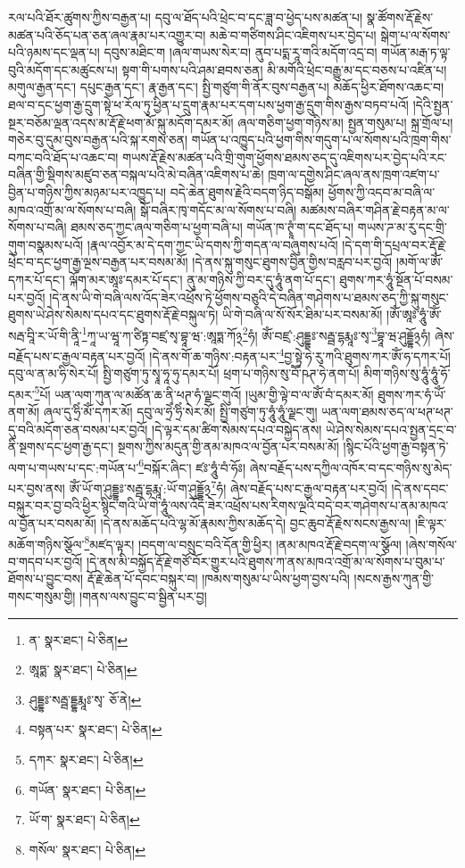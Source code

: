 རལ་པའི་ཐོར་ཚུགས་ཀྱིས་བརྒྱན་པ། དབུ་ལ་ཐོད་པའི་ཕྲེང་བ་དང་ཟླ་བ་ཕྱེད་པས་མཚན་པ། སྣ་ཚོགས་རྡོ་རྗེས་མཚན་པའི་ཅོད་པན་ཅན་ཞལ་རྣམ་པར་འགྱུར་བ། མཆེ་བ་གཙིགས་ཤིང་འཇིགས་པར་བྱེད་པ། སྒེག་པ་ལ་སོགས་པའི་ཉམས་དང་ལྡན་པ། དབུས་མཐིང་ག །ཞལ་གཡས་སེར་བ། ནུབ་པདྨ་རཱ་གའི་མདོག་འདྲ་བ། གཡོན་མརྒ་ཏ་ལྟ་བུའི་མདོག་དང་མཚུངས་པ། སྟག་གི་པགས་པའི་ཤམ་ཐབས་ཅན། མི་མགོའི་ཕྲེང་བརྒྱུ་མ་དང་བཅས་པ་འཛིན་པ། མགུལ་རྒྱན་དང་། དཔུང་རྒྱན་དང་། རྣ་རྒྱན་དང་། སྤྱི་གཙུག་གི་ནོར་བུས་བརྒྱན་པ། མཆོད་ཕྱིར་ཐོགས་འཆང་བ། ཐལ་བ་དང་ཕྱག་རྒྱ་དྲུག་སྟེ་ཕ་རོལ་ཏུ་ཕྱིན་པ་དྲུག་རྣམ་པར་དག་པས་ཕྱག་རྒྱ་དྲུག་གིས་རྒྱས་བཏབ་པའོ། །དེའི་སྤྱན་སྔར་བཅོམ་ལྡན་འདས་མ་རྡོ་རྗེ་ཕག་མོ་སྐུ་མདོག་དམར་མོ། ཞལ་གཅིག་ཕྱག་གཉིས་མ། སྤྱན་གསུམ་པ། སྐྲ་གྲོལ་པ། གཅེར་བུ་དུམ་བུས་བརྒྱན་པའི་སྐ་རགས་ཅན། གཡོན་པ་འཁྱུད་པའི་ཕྱག་གིས་གདུག་པ་ལ་སོགས་པའི་ཁྲག་གིས་བཀང་བའི་ཐོད་པ་འཆང་བ། གཡས་རྡོ་རྗེས་མཚན་པའི་གྲི་གུག་ཕྱོགས་ཐམས་ཅད་དུ་འཇིགས་པར་བྱེད་པའི་རང་བཞིན་གྱི་སྡིགས་མཛུབ་ཅན་བསྐལ་པའི་མེ་བཞིན་འཇིགས་པ་ཆེ། ཁྲག་ལ་དགྱེས་ཤིང་ཞལ་ནས་ཁྲག་འཛག་པ་བྱིན་པ་གཉིས་ཀྱིས་མཉམ་པར་འཁྱུད་པ། བདེ་ཆེན་ཐུགས་རྗེའི་བདག་ཉིད་བསྒོམ། ཕྱོགས་ཀྱི་འདབ་མ་བཞི་ལ་མཁའ་འགྲོ་མ་ལ་སོགས་པ་བཞི། སྒོ་བཞིར་ཁྭ་གདོང་མ་ལ་སོགས་པ་བཞི། མཚམས་བཞིར་གཤིན་རྗེ་བརྟན་མ་ལ་སོགས་པ་བཞི། ཐམས་ཅད་ཀྱང་ཞལ་གཅིག་པ་ཕྱག་བཞི་པ། གཡོན་ཁ་ཊྭཱཾ་ག་དང་ཐོད་པ། གཡས་ཌ་མ་རུ་དང་གྲི་གུག་བསྣམས་པའོ། །རྣལ་འབྱོར་མ་དེ་དག་ཀྱང་ཡི་དགས་ཀྱི་གདན་ལ་བཞུགས་པའོ། །དེ་དག་གི་དཔྲལ་བར་རྡོ་རྗེ་ཕྲེང་བ་དང་ཕྱག་རྒྱ་ལྔས་བརྒྱན་པར་བསམ་མོ། །དེ་ནས་སྐུ་གསུང་ཐུགས་བྱིན་གྱིས་བརླབ་པར་བྱའོ། །མགོ་ལ་ཨོཾ་དཀར་པོ་དང་། ལྐོག་མར་ཨཱཿ་དམར་པོ་དང་། ནུ་མ་གཉིས་ཀྱི་བར་དུ་ཧཱུཾ་ནག་པོ་དང་། ཐུགས་ཀར་ཧཱུཾ་སྔོན་པོ་བསམ་པར་བྱའོ། །དེ་ནས་ཡི་གེ་བཞི་ལས་འོད་ཟེར་འཕྲོས་ཏེ་ཕྱོགས་བཅུའི་དེ་བཞིན་གཤེགས་པ་ཐམས་ཅད་ཀྱི་སྐུ་གསུང་ཐུགས་ཡེ་ཤེས་སེམས་དཔའ་དང་ཐུགས་རྡོ་རྗེ་བསྐུལ་ཏེ། ཡི་གེ་བཞི་ལ་སོ་སོར་ཐིམ་པར་བསམ་མོ། །ཨོཾ་ཨཱཿ་ཧཱུཾ་ཨོཾ་སརྦ་བཱི་ར་ཡོ་གི་ནཱི་\footnote{ན་  སྣར་ཐང་།  པེ་ཅིན། }ཀཱ་ཡ་ཝཱ་ཀ་ཙིཏྟ་བཛྲ་སྭ་བྷཱ་ཝ་:ཨཱཏྨ་ཀོ྅\footnote{ཨཱཏྨ་  སྣར་ཐང་།  པེ་ཅིན། }ཧཾ། ཨོཾ་བཛྲ་:ཤུདྡྷཿ་སརྦྦ་དྷརྨཱཿ་སྭ་\footnote{ཤུདྡྷཿ་སརྦྦ་དྡྷརྨཱཿ་སྭ་  ཅོ་ནེ། }བྷཱ་ཝ་ཤུདྡྷོ྅ཧཾ། ཞེས་བརྗོད་པས་ང་རྒྱལ་བརྟན་པར་བྱའོ། །དེ་ནས་གོ་ཆ་གཉིས་:བརྟན་པར་\footnote{བསྟན་པར་  སྣར་ཐང་།  པེ་ཅིན། }བྱ་སྟེ་ཧེ་རུ་ཀའི་ཐུགས་ཀར་ཨོཾ་ཧ་དཀར་པོ། དབུ་ལ་ན་མ་ཧི་སེར་པོ། སྤྱི་གཙུག་ཏུ་སྭཱ་ཧཱ་ཧུ་དམར་པོ། ཕྲག་པ་གཉིས་སུ་བཽ་ཥཊ་ཧེ་ནག་པོ། མིག་གཉིས་སུ་ཧཱུཾ་ཧཱུཾ་ཧོ་དམར་\footnote{དཀར་  སྣར་ཐང་།  པེ་ཅིན། }པོ། ཡན་ལག་ཀུན་ལ་མཚོན་ཆ་ནི་ཕཊ་ཧཾ་ལྗང་གུའོ། །ཡུམ་གྱི་ལྟེ་བ་ལ་ཨོཾ་བཾ་དམར་མོ། ཐུགས་ཀར་ཧཾ་ཡོཾ་ནག་མོ། ཞལ་དུ་ཧྲིཾ་མོཾ་དཀར་མོ། དབུ་ལ་ཧྲེཾ་ཧྲིཾ་སེར་མོ། སྤྱི་གཙུག་ཏུ་ཧཱུཾ་ཧཱུཾ་ལྗང་གུ། ཡན་ལག་ཐམས་ཅད་ལ་ཕཊ་ཕཊ་དུ་བའི་མདོག་ཅན་བསམ་པར་བྱའོ། །དེ་ལྟར་དམ་ཚིག་སེམས་དཔའ་བསྐྱེད་ནས། ཡེ་ཤེས་སེམས་དཔའ་སྤྱན་དྲང་བ་ནི་སྔགས་དང་ཕྱག་རྒྱ་དང་། སྔགས་ཀྱིས་མདུན་གྱི་ནམ་མཁའ་ལ་བྱོན་པར་བསམ་མོ། །སྙིང་པོའི་ཕྱག་རྒྱ་བསྟན་ཏེ་ལག་པ་གཡས་པ་དང་:གཡོན་པ་\footnote{གཡོན་  སྣར་ཐང་།  པེ་ཅིན། }བསྐོར་ཞིང་། ཛཿ་ཧཱུཾ་བཾ་ཧོཿ། ཞེས་བརྗོད་པས་དཀྱིལ་འཁོར་བ་དང་གཉིས་སུ་མེད་པར་བྱས་ནས། ཨོཾ་ཡོ་ག་ཤུདྡྷཿ་སརྦྦ་དྷརྨཱ་:ཡོ་ག་ཤུདྡྷོ྅\footnote{ཡོ་ག་  སྣར་ཐང་།  པེ་ཅིན། }ཧཾ། ཞེས་བརྗོད་པས་ང་རྒྱལ་བརྟན་པར་བྱའོ། །དེ་ནས་དབང་བསྐུར་བར་བྱ་བའི་ཕྱིར་སྙིང་གའི་ཡི་གེ་ཧཱུཾ་ལས་འོད་ཟེར་འཕྲོས་པས་རིགས་ལྔའི་བདེ་བར་གཤེགས་པ་ནམ་མཁའ་ལ་བྱོན་པར་བསམ་མོ། །དེ་ནས་མཆོད་པའི་ལྷ་མོ་རྣམས་ཀྱིས་མཆོད་དེ། བྱང་ཆུབ་རྡོ་རྗེས་སངས་རྒྱས་ལ། །ཇི་ལྟར་མཆོག་གཉིས་སྩོལ་\footnote{གསོལ་  སྣར་ཐང་།  པེ་ཅིན། }མཛད་ལྟར། །བདག་ལ་བསྲུང་བའི་དོན་གྱི་ཕྱིར། །ནམ་མཁའ་རྡོ་རྗེ་བདག་ལ་སྩོལ། །ཞེས་གསོལ་བ་གདབ་པར་བྱའོ། །དེ་ནས་མི་བསྐྱོད་རྡོ་རྗེ་གཙོ་བོར་གྱུར་པའི་ཐུགས་ཀ་ནས་མཁའ་འགྲོ་མ་ལ་སོགས་པ་བུམ་པ་ཐོགས་པ་བྱུང་བས། རྡོ་རྗེ་ཆེན་པོ་དབང་བསྐུར་བ། །ཁམས་གསུམ་པ་ཡིས་ཕྱག་བྱས་པའི། །སངས་རྒྱས་ཀུན་གྱི་གསང་གསུམ་གྱི། །གནས་ལས་བྱུང་བ་སྦྱིན་པར་བྱ། 